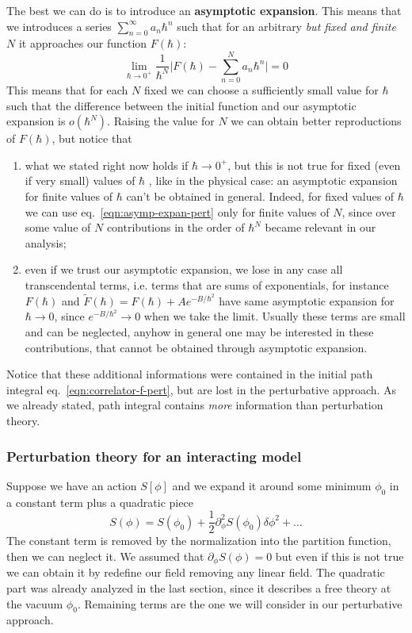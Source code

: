 \documentclass[../main/main.tex]{subfiles}
\begin{document}
The best we can do is to introduce an \textbf{asymptotic expansion}. This means that we introduces a series $\sum_{n=0}^\infty a_n\hbar^n$ such that for an arbitrary \emph{but fixed and finite} $N$ it approaches our function $F(\hbar)$:
\begin{equation}\label{eqn:asymp-expan-pert}
\lim_{\hbar\to0^+}\frac1{\hbar^N}\Bigg\vert F(\hbar)-\sum_{n=0}^Na_n\hbar^n\Bigg\vert=0
\end{equation}
This means that for each $N$ fixed we can choose a sufficiently small value for $\hbar$ such that the difference between the initial function and our asymptotic expansion is $o(\hbar^N)$. Raising the value for $N$ we can obtain better reproductions of $F(\hbar)$, but notice that 
\begin{enumerate}[label=\textbullet]
\item what we stated right now holds if $\hbar\to0^+$, but this is not true  for fixed (even if very small) values of $\hbar$ , like in the physical case: an asymptotic expansion for finite values of $\hbar$ can't be obtained in general. Indeed, for fixed values of $\hbar$ we can use eq.~\eqref{eqn:asymp-expan-pert} only for finite values of $N$, since over some value of $N$ contributions in the order of $\hbar^N$ became relevant in our analysis;
\item even if we trust our asymptotic expansion, we lose in any case all transcendental terms, i.e. terms that are sums of exponentials, for instance $F(\hbar)$ and $\widetilde F(\hbar)=F(\hbar)+Ae^{-B/\hbar^2}$ have same asymptotic expansion for $\hbar\to0$, since $e^{-B/\hbar^2}\to0$ when we take the limit. Usually these terms are small and can be neglected, anyhow in general one may be interested in these contributions, that cannot be obtained through asymptotic expansion. 
\end{enumerate}
Notice that these additional informations were contained in the initial path integral eq.~\eqref{eqn:correlator-f-pert}, but are lost in the perturbative approach. As we already stated, path integral contains \emph{more} information than perturbation theory. 

\subsubsection{Perturbation theory for an interacting model}

Suppose we have an action $S[\phi]$ and we expand it around some minimum $\phi_0$  in a constant term plus a quadratic piece
\[S(\phi)=S(\phi_0)+\frac12\partial_\phi^2S(\phi_0)\delta\phi^2+\dots\]
The constant term is removed by the normalization into the partition function, then we can neglect it. We assumed that $\partial_\phi S(\phi)=0$ but even if this is not true we can obtain it by redefine our field removing any linear field. The quadratic part was already analyzed in the last section, since it describes a free theory at the vacuum $\phi_0$. Remaining terms are the one we will consider in our perturbative approach. 
\end{document}
